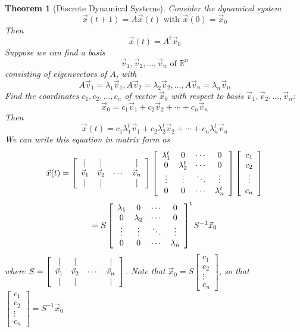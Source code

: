 \documentclass[10pt]{report}
\newtheorem{thm2}{Theorem}[section]
\begin{document}
\begin{thm2}[Discrete Dynamical Systems]
Consider the dynamical system
$$\vec{x}(t+1) = A\vec{x}(t) \text{  with  } \vec{x}(0) = \vec{x}_0$$
Then
$$\vec{x}(t) = A^t\vec{x}_0$$
Suppose we can find a basis
$$\vec{v}_1, \vec{v}_2,...,\vec{v}_n \text{  of  } \mathbb{R}^n$$
consisting of eigenvectors of $A$, with
$$A\vec{v}_1 = \lambda_1\vec{v}_1, A\vec{v}_2 = \lambda_2\vec{v}_2,...,A\vec{v}_n = \lambda_n \vec{v}_n$$
Find the coordinates $c_1, c_2,..., c_n$ of vector $\vec{x}_0$ with respect to basis $\vec{v}_1, \vec{v}_2,...,\vec{v}_n$:
$$\vec{x}_0=c_1\vec{v}_1 + c_2\vec{v}_2 + \cdots + c_n\vec{v}_n$$
Then
$$\vec{x}(t)=c_1\lambda_1^t \vec{v}_1 + c_2\lambda_2^t \vec{v}_2 + \cdots + c_n\lambda_n^t\vec{v}_n$$
We can write this equation in matrix form as
$$\vec{x}(t) = \left[\begin{array}{c c c c}
| & | & & |\\
\vec{v}_1 & \vec{v}_2 & \cdots & \vec{v}_n\\
| & | & & |
\end{array}\right]\left[\begin{array}{c c c c}
\lambda_1^t & 0 & \cdots & 0\\
0 & \lambda_2^t & \cdots & 0\\
\vdots & \vdots & \ddots & \vdots \\
0 & 0 & \cdots & \lambda_n^t
\end{array}\right]
\left[\begin{array}{c}
c_1\\
c_2\\
\vdots\\
c_n
\end{array}\right]$$
$$=S\left[\begin{array}{c c c c}
\lambda_1 & 0 & \cdots & 0\\
0 & \lambda_2 & \cdots & 0\\
\vdots & \vdots & \ddots & \vdots \\
0 & 0 & \cdots & \lambda_n
\end{array}\right]^tS^{-1}\vec{x}_0$$
where $S = \left[\begin{array}{c c c c}
| & | & & |\\
\vec{v}_1 & \vec{v}_2 & \cdots & \vec{v}_n\\
| & | & & |
\end{array}\right]$. Note that $\vec{x}_0=S\left[\begin{array}{c}
c_1\\
c_2\\
\vdots\\
c_n
\end{array}\right]$, so that $\left[\begin{array}{c}
c_1\\
c_2\\
\vdots\\
c_n
\end{array}\right] = S^{-1}\vec{x}_0$
\end{thm2}
\end{document}
